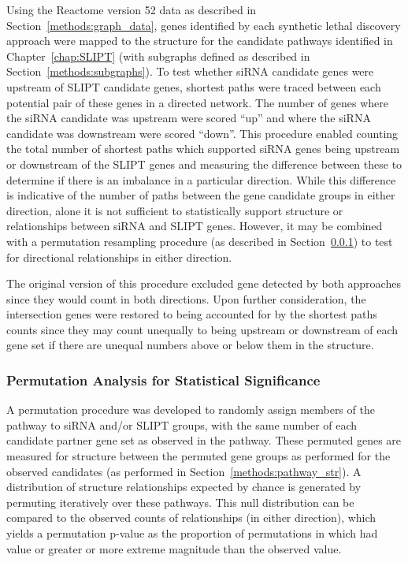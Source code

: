 Using the Reactome version 52 data \citep{Reactome} as described in Section~\ref{methods:graph_data}, genes identified by each \gls{synthetic lethal} discovery approach were mapped to the  structure for the candidate pathways identified in Chapter~\ref{chap:SLIPT} (with subgraphs defined as described in Section~\ref{methods:subgraphs}). To test whether \gls{siRNA} candidate genes were upstream of \gls{SLIPT} candidate genes, \glspl{shortest path} were traced between each potential pair of these genes in a directed network. The number of genes where the \gls{siRNA} candidate was upstream were scored ``up'' and where the \gls{siRNA} candidate was downstream were scored ``down''.  This procedure enabled counting the total number of \glspl{shortest path} which supported \gls{siRNA} genes being upstream or downstream of the \gls{SLIPT} genes and measuring the difference between these to determine if there is an imbalance in a particular direction. While this difference is indicative of the number of paths between the gene candidate groups in either direction, alone it is not sufficient to statistically support structure or relationships between \gls{siRNA} and \gls{SLIPT} genes. However, it may be combined with a permutation resampling procedure (as described in Section~\ref{methods:network_permutation}) to test for directional relationships in either direction.

The original version of this procedure excluded gene detected by both approaches since they would count in both directions. Upon further consideration, the intersection genes were restored to being accounted for by the \glspl{shortest path} counts since they may count unequally to being upstream or downstream of each gene set if there are unequal numbers above or below them in the  structure.

\subsubsection{Permutation Analysis for Statistical Significance} \label{methods:network_permutation}
A permutation procedure was developed to randomly assign members of the pathway to \gls{siRNA} and/or \gls{SLIPT} groups, with the same number of each candidate partner gene set as observed in the pathway. These permuted genes are measured for  structure between the permuted gene groups as performed for the observed candidates (as performed in Section~\ref{methods:pathway_str}). A distribution of  structure relationships expected by chance is generated by permuting iteratively over these pathways. This null distribution can be compared to the observed counts of relationships (in either direction), which yields a permutation p-value as the proportion of permutations in which had value or greater or more extreme magnitude than the observed value.

